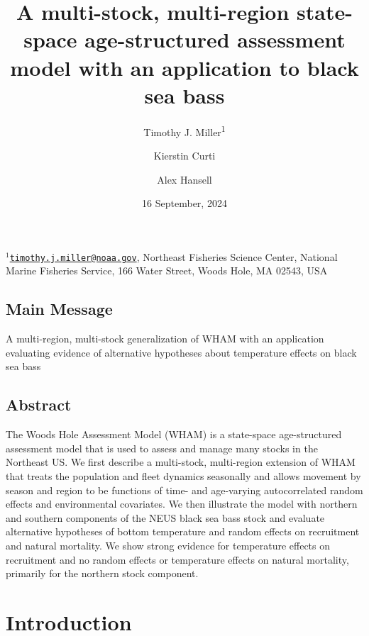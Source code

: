 \documentclass[
]{article}
\title{A multi-stock, multi-region state-space age-structured assessment
model with an application to black sea bass}
\author{Timothy J. Miller\textsuperscript{1} \and Kierstin
Curti \and Alex Hansell}
\date{16 September, 2024}
\begin{document}
\maketitle

\(^1\)\href{mailto:timothy.j.miller@noaa.gov}{\nolinkurl{timothy.j.miller@noaa.gov}},
Northeast Fisheries Science Center, National Marine Fisheries Service,
166 Water Street, Woods Hole, MA 02543, USA\\

\pagebreak

\hypertarget{main-message}{%
\subsection*{Main Message}\label{main-message}}

A multi-region, multi-stock generalization of WHAM with an application
evaluating evidence of alternative hypotheses about temperature effects
on black sea bass

\hypertarget{abstract}{%
\subsection*{Abstract}\label{abstract}}

The Woods Hole Assessment Model (WHAM) is a state-space age-structured
assessment model that is used to assess and manage many stocks in the
Northeast US. We first describe a multi-stock, multi-region extension of
WHAM that treats the population and fleet dynamics seasonally and allows
movement by season and region to be functions of time- and age-varying
autocorrelated random effects and environmental covariates. We then
illustrate the model with northern and southern components of the NEUS
black sea bass stock and evaluate alternative hypotheses of bottom
temperature and random effects on recruitment and natural mortality. We
show strong evidence for temperature effects on recruitment and no
random effects or temperature effects on natural mortality, primarily
for the northern stock component.

\pagebreak

\hypertarget{introduction}{%
\section*{Introduction}\label{introduction}}
\end{document}
